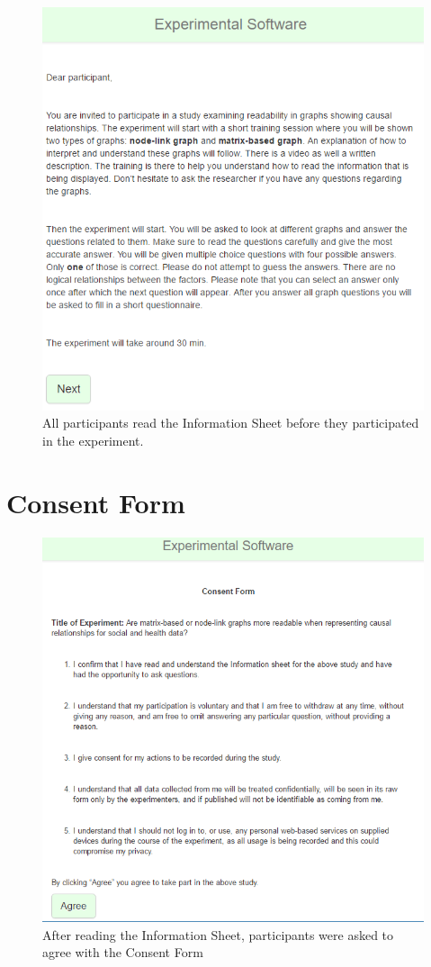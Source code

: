 \documentclass{l4proj}
\begin{document}
\begin{appendices}
\begin{figure}[H]
\centering
\includegraphics[width=12cm]{images/informationsheet.PNG}
\caption{All participants read the Information Sheet before they participated in the experiment.}
\label{informationsheet}
\end{figure}

\section{Consent Form}

\begin{figure}[H]
\centering
\includegraphics[width=14cm]{images/consent.PNG}
\caption{After reading the Information Sheet, participants were asked to agree with the Consent Form}
\label{consent}
\end{figure}


\end{appendices}
\end{document}
